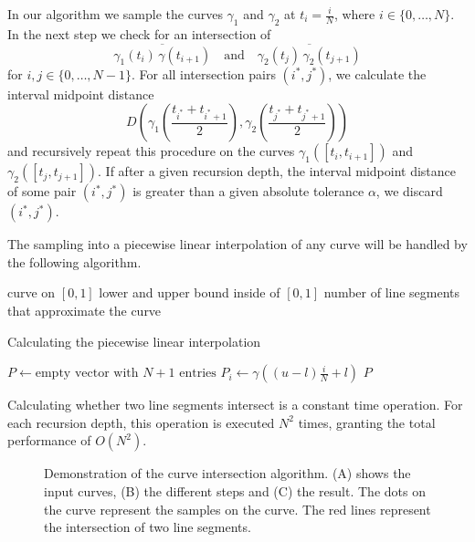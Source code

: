 \documentclass[a4paper, 11pt]{report}
\theoremstyle{definition}
\newcommand{\Desc}[2]{\State \makebox[12em][l]{#1}#2}
\begin{document}
	In our algorithm we sample the curves $\gamma_1$ and $\gamma_2$ at $t_i = \frac{i}{N}$, where $i \in \{0,\ldots,N\}$. In the next step we check for an intersection of 
		$$\overline{\gamma_1(t_i) \, \gamma(t_{i+1})} \quad\text{and}\quad \overline{\gamma_2(t_j) \, \gamma_2(t_{j+1})}$$
	for $i,j \in \{0,\ldots,N-1\}$. For all intersection pairs $(i^*, j^*)$, we calculate the interval midpoint distance
		$$D \left( \gamma_1 \left( \frac{t_{i^*} + t_{i^*+1}}{2} \right), \gamma_2 \left( \frac{t_{j^*} + t_{j^*+1}}{2} \right) \right)$$
	and recursively repeat this procedure on the curves $\gamma_1([t_i, t_{i+1}])$ and $\gamma_2([t_j, t_{j+1}])$. If after a given recursion depth, the interval midpoint distance of some pair $(i^*, j^*)$ is greater than a given absolute tolerance $\alpha$, we discard $(i^*, j^*)$.
	
	The sampling into a piecewise linear interpolation of any curve will be handled by the following algorithm.
	\begin{algorithm}[H]
		\begin{algorithmic}[1]
			\Input
				\Desc{$\gamma$}{curve on $[0,1]$}
				\Desc{$l,u$}{lower and upper bound inside of $[0,1]$}
				\Desc{$N$}{number of line segments that approximate the curve}
			\EndInput

			\caption{Calculating the piecewise linear interpolation}\label{alg:samplecurve}
				\State $P \gets \text{empty vector with } N+1 \text{ entries}$
					\State $P_i \gets \gamma \left( (u-l) \frac{i}{N} + l \right)$
				\EndFor
				\State \Return $P$
			\EndProcedure
		\end{algorithmic}
	\end{algorithm}
	
	Calculating whether two line segments intersect is a constant time operation. For each recursion depth, this operation is executed $N^2$ times, granting the total performance of $O(N^2)$.

	\begin{figure}[H]
		\centering
		
		\caption{Demonstration of the curve intersection algorithm. (A) shows the input curves, (B) the different steps and (C) the result. The dots on the curve represent the samples on the curve. The red lines represent the intersection of two line segments.}
		\label{fig:piecewiselinearintersection}
	\end{figure}
	
\end{document}
